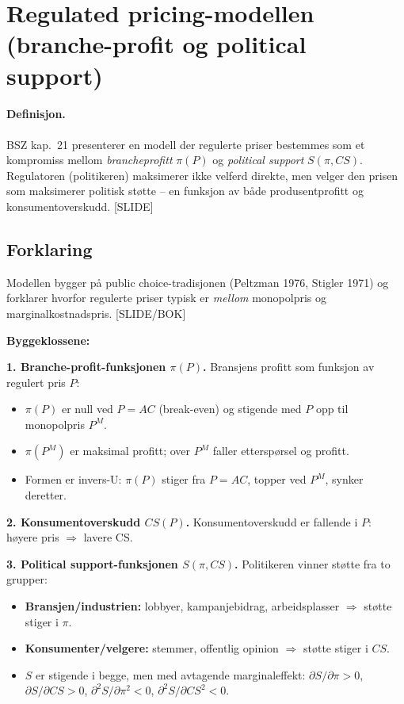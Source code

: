 \section{Regulated pricing-modellen (branche-profit og political support)}\label{thr:regulated-pricing-model}

\paragraph{Definisjon.} BSZ kap.\ 21 presenterer en modell der regulerte priser bestemmes som et kompromiss mellom \emph{brancheprofitt} $\pi(P)$ og \emph{political support} $S(\pi, CS)$. Regulatoren (politikeren) maksimerer ikke velferd direkte, men velger den prisen som maksimerer politisk støtte -- en funksjon av både produsentprofitt og konsumentoverskudd. [SLIDE]

\subsection*{Forklaring}

Modellen bygger på public choice-tradisjonen (Peltzman 1976, Stigler 1971) og forklarer hvorfor regulerte priser typisk er \emph{mellom} monopolpris og marginal\-kostnadspris. [SLIDE/BOK]

\textbf{Byggeklossene:}

\textbf{1. Branche-profit-funksjonen $\pi(P)$.} Bransjens profitt som funksjon av regulert pris $P$:
\begin{itemize}\setlength{\itemsep}{1pt}
\item $\pi(P)$ er null ved $P=AC$ (break-even) og stigende med $P$ opp til monopolpris $P^M$.
\item $\pi(P^M)$ er maksimal profitt; over $P^M$ faller etterspørsel og profitt.
\item Formen er invers-U: $\pi(P)$ stiger fra $P=AC$, topper ved $P^M$, synker deretter.
\end{itemize}

\textbf{2. Konsumentoverskudd $CS(P)$.} Konsumentoverskudd er fallende i $P$: høyere pris $\Rightarrow$ lavere CS.

\textbf{3. Political support-funksjonen $S(\pi, CS)$.} Politikeren vinner støtte fra to grupper:
\begin{itemize}\setlength{\itemsep}{1pt}
\item \textbf{Bransjen/industrien:} lobbyer, kampanjebidrag, arbeidsplasser $\Rightarrow$ støtte stiger i $\pi$.
\item \textbf{Konsumenter/velgere:} stemmer, offentlig opinion $\Rightarrow$ støtte stiger i $CS$.
\item $S$ er stigende i begge, men med avtagende marginaleffekt: $\partial S/\partial \pi > 0$, $\partial S/\partial CS > 0$, $\partial^2 S/\partial \pi^2 < 0$, $\partial^2 S/\partial CS^2 < 0$.
\end{itemize}

